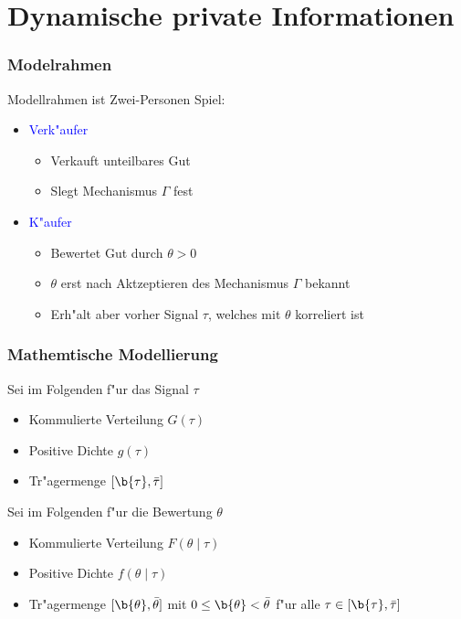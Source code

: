 \section{Dynamische private Informationen}

\begin{frame}
\frametitle{Modelrahmen}
\justifying
Modellrahmen ist Zwei-Personen Spiel:
\begin{itemize}
    \item \textcolor{blue}{Verk"aufer}
    \begin{itemize}
      \item Verkauft unteilbares Gut
      \item Slegt Mechanismus $\Gamma$ fest
    \end{itemize}
    \item \textcolor{blue}{K"aufer}
    \begin{itemize}
      \item Bewertet Gut durch $\theta > 0$
      \item $\theta$ erst nach Aktzeptieren des Mechanismus $\Gamma$ bekannt
      \item Erh"alt aber vorher Signal $\tau$, welches mit $\theta$ korreliert ist
    \end{itemize}
\end{itemize}

\end{frame}

\begin{frame}
\frametitle{Mathemtische Modellierung}
\justifying
Sei im Folgenden f"ur das Signal $\tau$
\begin{itemize}
    \item Kommulierte Verteilung $G(\tau)$
    \item Positive Dichte $g(\tau)$
    \item Tr"agermenge $[ \b{\tau} , \bar{\tau} ]$
\end{itemize}

Sei im Folgenden f"ur die Bewertung $\theta$
\begin{itemize}
    \item Kommulierte Verteilung $F(\theta \mid \tau)$
    \item Positive Dichte $f(\theta \mid \tau)$
    \item Tr"agermenge $[ \b{\theta} , \bar{\theta} ]$ mit $0 \leq \b{\theta} < \bar{\theta} $ f"ur alle $\tau \in [ \b{\tau} , \bar{\tau} ]$
\end{itemize}
\end{frame}

